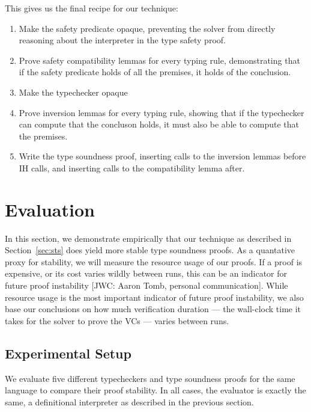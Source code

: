 \documentclass[sigplan,review,screen,anonymous]{acmart}
\newcommand{\comm}[3]{\textcolor{#1}{[#2: #3]}}
\newcommand{\jwc}[1]{\comm{dkgreen}{JWC}{#1}}
\begin{document}
This gives us the final recipe for our technique:

\begin{enumerate}
  \item Make the safety predicate opaque, preventing the solver from directly reasoning about the interpreter in the type safety proof.
  \item Prove safety compatibility lemmas for every typing rule, demonstrating that if the safety predicate holds of all the premises, it holds of the conclusion.
  \item Make the typechecker opaque
  \item Prove inversion lemmas for every typing rule, showing that if the typechecker can compute that the concluson holds, it must also be able to compute that the premises.
  \item Write the type soundness proof, inserting calls to the inversion lemmas before IH calls, and inserting calls to the compatibility lemma after.
\end{enumerate}






\section{Evaluation}
\label{sec:eval}
In this section, we demonstrate empirically that our technique as described in Section~\ref{sec:sts}
does yield more stable type soundness proofs. As a quantative proxy for stability, we will measure
the resource usage of our proofs. If a proof is expensive, or its cost varies wildly
between runs, this can be an indicator for future proof instability \jwc{Aaron Tomb, personal communication}.
While resource usage is the most important indicator of future proof instability, we also
base our conclusions on how much verification duration --- the wall-clock time it takes for the solver
to prove the VCs --- varies between runs.

\subsection*{Experimental Setup}
We evaluate five different typecheckers and type soundness proofs for the same
language to compare their proof stability. In all cases, the evaluator is exactly the same, a definitional
interpreter as described in the previous section.
\end{document}
